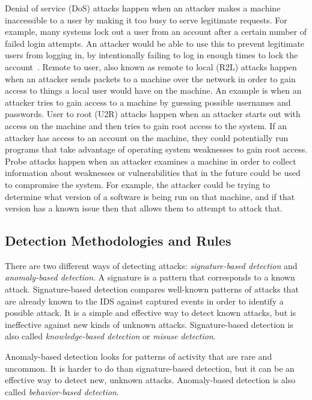 \documentclass{sig-alternate}
\begin{document}
Denial of service (DoS) attacks happen when an attacker makes a machine inaccessible to a user by making it too busy to serve legitimate requests. For example, many systems lock out a user from an account after a certain number of failed login attempts. An attacker would be able to use this to prevent legitimate users from logging in, by intentionally failing to log in enough times to lock the account~\cite{DoSAttacks}. Remote to user, also known as remote to local (R2L) attacks happen when an attacker sends packets to a machine over the network in order to gain access to things a local user would have on the machine. An example is when an attacker tries to gain access to a machine by guessing possible usernames and passwords. User to root (U2R) attacks happen when an attacker starts out with access on the machine and then tries to gain root access to the system. If an attacker has access to an account on the machine, they could potentially run programs that take advantage of operating system weaknesses to gain root access. Probe attacks happen when an attacker examines a machine in order to collect information about weaknesses or vulnerabilities that in the future could be used to compromise the system. For example, the attacker could be trying to determine what version of a software is being run on that machine, and if that version has a known issue then that allows them to attempt to attack that.~\cite{DBLP:journals/corr/abs-1204-1336, typesOfAttacks}




\subsection{Detection Methodologies and Rules}
\label{sec:detectionMeth}
There are two different ways of detecting attacks: \emph{signature-based detection} and \emph{anomaly-based detection}. A signature is a pattern that corresponds to a known attack. Signature-based detection compares well-known patterns of attacks that are already known to the IDS against captured events in order to identify a possible attack. It is a simple and effective way to detect known attacks, but is ineffective against new kinds of unknown attacks. Signature-based detection is also called \emph{knowledge-based detection} or \emph{misuse detection}.~\cite{Liao201316}

Anomaly-based detection looks for patterns of activity that are rare and uncommon. It is harder to do than signature-based detection, but it can be an effective way to detect new, unknown attacks. Anomaly-based detection is also called \emph{behavior-based detection}.~\cite{DBLP:journals/corr/abs-1204-1336}
\end{document}
